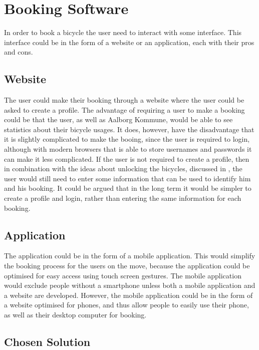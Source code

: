 \section{Booking Software}
In order to book a bicycle the user need to interact with some interface.
This interface could be in the form of a website or an application, each with their pros and cons.

\subsection{Website}
The user could make their booking through a website where the user could be asked to create a profile.
The advantage of requiring a user to make a booking could be that the user, as well as Aalborg Kommune, would be able to see statistics about their bicycle usages.
It does, however, have the disadvantage that it is slightly complicated to make the booing, since the user is required to login, although with modern browsers that is able to store usernames and passwords it can make it less complicated.
If the user is not required to create a profile, then in combination with the ideas about unlocking the bicycles, discussed in , the user would still need to enter some information that can be used to identify him and his booking.
It could be argued that in the long term it would be simpler to create a profile and login, rather than entering the same information for each booking.

\subsection{Application}
The application could be in the form of a mobile application. 
This would simplify the booking process for the users on the move, because the application could be optimised for easy access using touch screen gestures.
The mobile application would exclude people without a smartphone unless both a mobile application and a website are developed.
However, the mobile application could be in the form of a website optimised for phones, and thus allow people to easily use their phone, as well as their desktop computer for booking. 

\subsection{Chosen Solution}
